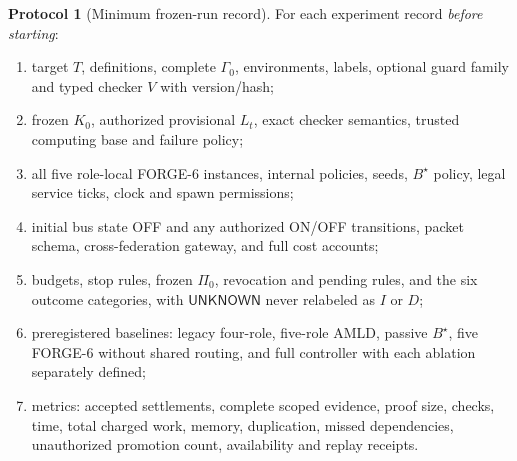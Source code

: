 \documentclass[11pt,letterpaper,oneside]{book}
\theoremstyle{definition}
\newtheorem{protocol}[theorem]{Protocol}
\theoremstyle{remark}
\begin{document}
\begin{protocol}[Minimum frozen-run record]
For each experiment record \emph{before starting}:
\begin{enumerate}
\item target $T$, definitions, complete $\Gamma_0$, environments, labels,
optional guard family and typed checker $V$ with version/hash;
\item frozen $K_0$, authorized provisional $L_t$, exact checker semantics,
trusted computing base and failure policy;
\item all five role-local FORGE-6 instances, internal policies, seeds,
$B^\star$ policy, legal service ticks, clock and spawn permissions;
\item initial bus state OFF and any authorized ON/OFF transitions,
packet schema, cross-federation gateway, and full cost accounts;
\item budgets, stop rules, frozen $\Pi_0$, revocation and pending rules,
and the six outcome categories, with
$\mathsf{UNKNOWN}$ never relabeled as $I$ or $D$;
\item preregistered baselines: legacy four-role, five-role AMLD,
passive $B^\star$, five FORGE-6 without shared routing, and full
controller with each ablation separately defined;
\item metrics: accepted settlements, complete scoped evidence,
proof size, checks, time, total charged work, memory, duplication,
missed dependencies, unauthorized promotion count, availability and
replay receipts.
\end{enumerate}
\end{protocol}
\end{document}

